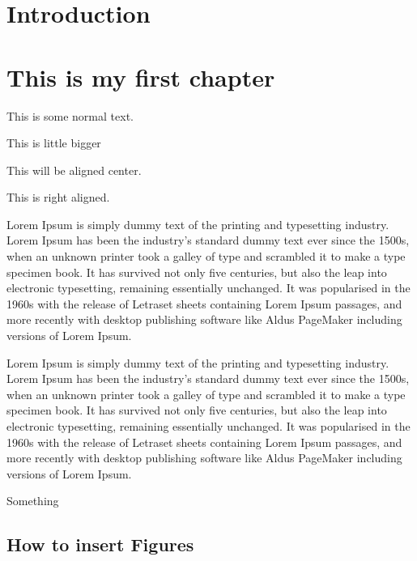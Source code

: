 \documentclass[12pt,a4paper,oneside]{book}
\begin{document}
\tableofcontents

\chapter{Introduction}


\chapter{This is my first chapter}\label{ch:1}

This is some normal text.

{\Huge
	This is little bigger
}

\begin{center}
This will be aligned center.
\end{center}


\begin{flushright}
	This is right aligned.
\end{flushright}

\begin{flushleft}
Lorem Ipsum is simply dummy text of the printing and typesetting industry. Lorem Ipsum has been the industry's standard dummy text ever since the 1500s, when an unknown printer took a galley of type and scrambled it to make a type specimen book. It has survived not only five centuries, but also the leap into electronic typesetting, remaining essentially unchanged. It was popularised in the 1960s with the release of Letraset sheets containing Lorem Ipsum passages, and more recently with desktop publishing software like Aldus PageMaker including versions of Lorem Ipsum.
\end{flushleft}


Lorem Ipsum is simply dummy text of the printing and typesetting industry. Lorem Ipsum has been the industry's standard dummy text ever since the 1500s, when an unknown printer took a galley of type and scrambled it to make a type specimen book. It has survived not only five centuries, but also the leap into electronic typesetting, remaining essentially unchanged. It was popularised in the 1960s with the release of Letraset sheets containing Lorem Ipsum passages, and more recently with desktop publishing software like Aldus PageMaker including versions of Lorem Ipsum.

Something



\section{How to insert Figures}
\end{document}
